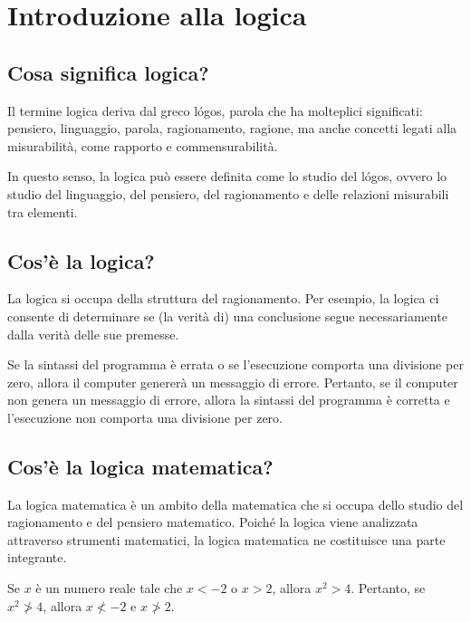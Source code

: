 
\section{Introduzione alla logica}
\subsection{Cosa significa logica?}

Il termine logica deriva dal greco lógos, parola che ha molteplici significati: pensiero, linguaggio, parola, ragionamento, ragione, ma anche concetti legati alla misurabilità, come rapporto e commensurabilità.

In questo senso, la logica può essere definita come lo studio del lógos, ovvero lo studio del linguaggio, del pensiero, del ragionamento e delle relazioni misurabili tra elementi.

\subsection{Cos'è la logica?}
La logica si occupa della struttura del ragionamento. Per esempio, la logica ci consente di determinare se (la verità di) una conclusione segue necessariamente dalla verità delle sue premesse.

\begin{esempio}
Se la sintassi del programma è errata o se l'esecuzione comporta una divisione per zero, allora il computer genererà un messaggio di errore. Pertanto, se il computer non genera un messaggio di errore, allora la sintassi del programma è corretta e l'esecuzione non comporta una divisione per zero.
\end{esempio}


\subsection{Cos'è la logica matematica?}
La logica matematica è un ambito della matematica che si occupa dello studio del ragionamento e del pensiero matematico. Poiché la logica viene analizzata attraverso strumenti matematici, la logica matematica ne costituisce una parte integrante.

\begin{esempio}
Se $x$ è un numero reale tale che $x<-2$ o $x>2$, allora $x^2>4$. Pertanto, se $x^2 \not> 4$, allora $x\not<-2$ e $x \not > 2$.
\end{esempio}




